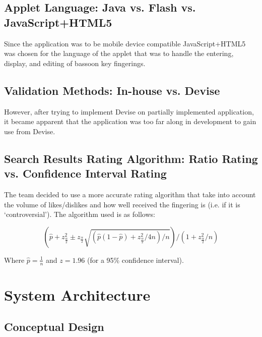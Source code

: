 \documentclass[12pt,english]{article}
\begin{document}
\subsection{Applet Language: Java vs. Flash vs. JavaScript+HTML5}

Since the application was to be mobile device compatible JavaScript+HTML5
was chosen for the language of the applet that was to handle the entering,
display, and editing of bassoon key fingerings.


\subsection{Validation Methods: In-house vs. Devise}

However, after trying to implement Devise on partially implemented
application, it became apparent that the application was too far along
in development to gain use from Devise.


\subsection{Search Results Rating Algorithm: Ratio Rating vs. Confidence Interval
Rating}

The team decided to use a more accurate rating algorithm that take
into account the volume of likes/dislikes and how well received the
fingering is (i.e. if it is `controversial'). The algorithm used is
as follows:

\[
(\hat{p}+z_{\frac{\alpha}{2}}^{2}\pm z_{\frac{\alpha}{2}}\sqrt{(\hat{p}(1-\hat{p})+z_{\frac{\alpha}{2}}^{2}/4n)/n})/(1+z_{\frac{\alpha}{2}}^{2}/n)
\]


Where $\hat{p}=\frac{1}{n}$ and $z=1.96$ (for a 95\% confidence
interval).


\section{System Architecture}


\subsection{Conceptual Design}
\end{document}
